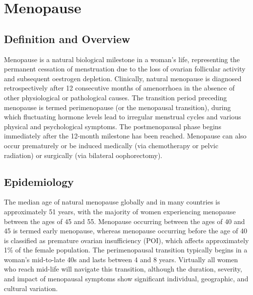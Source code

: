 \chapter{Menopause}

\section*{Definition and Overview}
Menopause is a natural biological milestone in a woman's life, representing the permanent cessation of menstruation due to the loss of ovarian follicular activity and subsequent oestrogen depletion. Clinically, natural menopause is diagnosed retrospectively after 12 consecutive months of amenorrhoea in the absence of other physiological or pathological causes. The transition period preceding menopause is termed perimenopause (or the menopausal transition), during which fluctuating hormone levels lead to irregular menstrual cycles and various physical and psychological symptoms. The postmenopausal phase begins immediately after the 12-month milestone has been reached. Menopause can also occur prematurely or be induced medically (via chemotherapy or pelvic radiation) or surgically (via bilateral oophorectomy).

\section*{Epidemiology}
The median age of natural menopause globally and in many countries is approximately 51 years, with the majority of women experiencing menopause between the ages of 45 and 55. Menopause occurring between the ages of 40 and 45 is termed early menopause, whereas menopause occurring before the age of 40 is classified as premature ovarian insufficiency (POI), which affects approximately 1\% of the female population. The perimenopausal transition typically begins in a woman's mid-to-late 40s and lasts between 4 and 8 years. Virtually all women who reach mid-life will navigate this transition, although the duration, severity, and impact of menopausal symptoms show significant individual, geographic, and cultural variation.

